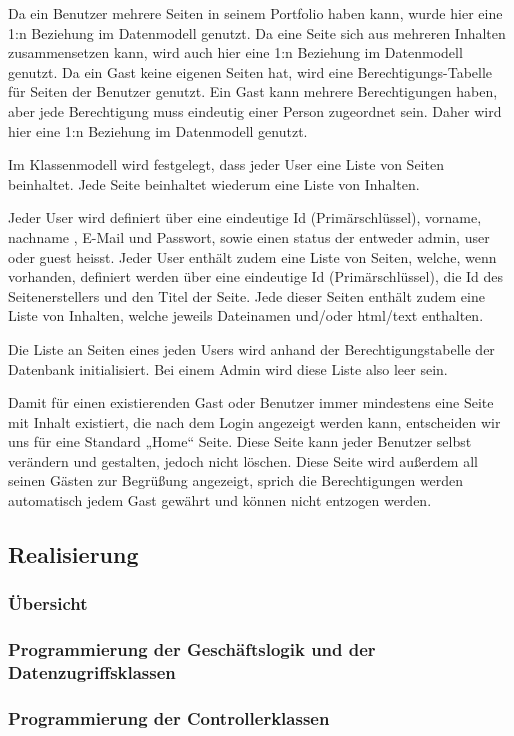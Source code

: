 \documentclass[10pt]{scrarticle}
\begin{document}
Da ein Benutzer mehrere Seiten in seinem Portfolio haben kann, wurde hier eine 1:n Beziehung im Datenmodell genutzt.
Da eine Seite sich aus mehreren Inhalten zusammensetzen kann, wird auch hier eine 1:n Beziehung im Datenmodell genutzt. 
Da ein Gast keine eigenen Seiten hat, wird eine Berechtigungs-Tabelle für Seiten der Benutzer genutzt. Ein Gast kann mehrere Berechtigungen haben, aber jede Berechtigung muss eindeutig einer Person zugeordnet sein. Daher wird hier eine 1:n Beziehung im Datenmodell genutzt.

Im Klassenmodell wird festgelegt, dass jeder User eine Liste von Seiten beinhaltet.
Jede Seite beinhaltet wiederum eine Liste von Inhalten.

Jeder User wird definiert über eine eindeutige Id (Primärschlüssel), vorname, nachname , E-Mail und Passwort, sowie einen status der entweder admin, user oder guest heisst.
Jeder User enthält zudem eine Liste von Seiten, welche, wenn vorhanden, definiert werden über eine eindeutige Id (Primärschlüssel), die Id des Seitenerstellers und den Titel der Seite.
Jede dieser Seiten enthält zudem eine Liste von Inhalten, welche jeweils Dateinamen und/oder html/text enthalten.

Die Liste an Seiten eines jeden Users wird anhand der Berechtigungstabelle der Datenbank initialisiert. Bei einem Admin wird diese Liste also leer sein.

Damit für einen existierenden Gast oder Benutzer immer mindestens eine Seite mit Inhalt existiert, die nach dem Login angezeigt werden kann, entscheiden wir uns für eine Standard „Home“ Seite.
Diese Seite kann jeder Benutzer selbst verändern und gestalten, jedoch nicht löschen. Diese Seite wird außerdem all seinen Gästen zur Begrüßung angezeigt, sprich die Berechtigungen werden automatisch jedem Gast gewährt und können nicht entzogen werden.

\subsection{Realisierung}
\subsubsection{Übersicht}
\subsubsection{Programmierung der Geschäftslogik und der Datenzugriffsklassen}
\subsubsection{Programmierung der Controllerklassen}
\end{document}
